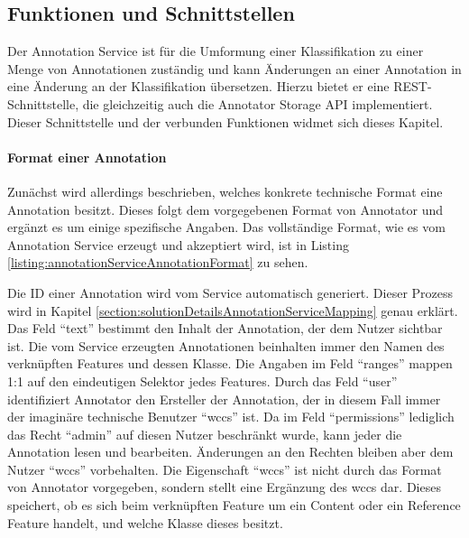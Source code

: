 \subsection{Funktionen und Schnittstellen}
    \label{section:solutionDetailsAnnotationServiceFunctions}
    Der Annotation Service ist für die Umformung einer Klassifikation zu
    einer Menge von Annotationen zuständig und kann Änderungen an einer
    Annotation in eine Änderung an der Klassifikation übersetzen.
    Hierzu bietet er eine REST-Schnittstelle, die gleichzeitig auch die Annotator Storage API implementiert.
    Dieser Schnittstelle und der verbunden Funktionen widmet sich dieses Kapitel.

    \paragraph{Format einer Annotation}
    Zunächst wird allerdings beschrieben, welches konkrete technische Format eine Annotation besitzt.
    Dieses folgt dem vorgegebenen Format von Annotator und ergänzt es um einige spezifische Angaben.
    Das vollständige Format, wie es vom Annotation Service erzeugt und akzeptiert wird,
    ist in Listing \ref{listing:annotationServiceAnnotationFormat} zu sehen.

    

    Die ID einer Annotation wird vom Service automatisch generiert.
    Dieser Prozess wird in Kapitel \ref{section:solutionDetailsAnnotationServiceMapping}
    genau erklärt.
    Das Feld "`text"' bestimmt den Inhalt der Annotation, der dem Nutzer sichtbar ist.
    Die vom Service erzeugten Annotationen beinhalten immer den Namen des verknüpften Features und dessen Klasse.
    Die Angaben im Feld "`ranges"' mappen 1:1 auf den eindeutigen Selektor jedes Features.
    Durch das Feld "`user"' identifiziert Annotator den Ersteller der Annotation,
    der in diesem Fall immer der imaginäre technische Benutzer "`wccs"' ist.
    Da im Feld "`permissions"' lediglich das Recht "`admin"' auf diesen Nutzer beschränkt wurde,
    kann jeder die Annotation lesen und bearbeiten.
    Änderungen an den Rechten bleiben aber dem Nutzer "`wccs"' vorbehalten.
    Die Eigenschaft "`wccs"' ist nicht durch das Format von Annotator vorgegeben,
    sondern stellt eine Ergänzung des \gls{wccs} dar.
    Dieses speichert, ob es sich beim verknüpften Feature um ein Content oder ein Reference Feature handelt,
    und welche Klasse dieses besitzt.

